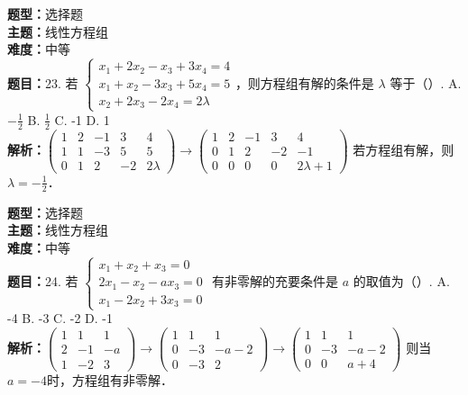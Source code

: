 \documentclass{ctexart}
\newenvironment{question}[5]{%
	\noindent\textbf{题型：}#1\\
	\textbf{主题：}#2\\
	\textbf{难度：}#3\\
	\textbf{题目：}#4\\
	\textbf{解析：}#5\\
	\vspace{1em}
}{}
\begin{document}
	\begin{question}
		{选择题}
		{线性方程组}
		{中等}
		{23. 若 \(\left\{\begin{array}{l}x_1+2 x_2-x_3+3 x_4=4 \\ x_1+x_2-3 x_3+5 x_4=5 \\ x_2+2 x_3-2 x_4=2 \lambda\end{array}\right.\)，则方程组有解的条件是 \(\lambda\) 等于（）.
			A. \(-\frac{1}{2}\)
			B. \(\frac{1}{2}\)
			C. -1
			D. 1}
		{\(\left(\begin{array}{cccc|c}1 & 2 & -1 & 3 & 4 \\ 1 & 1 & -3 & 5 & 5 \\ 0 & 1 & 2 & -2 & 2 \lambda\end{array}\right) \rightarrow\left(\begin{array}{cccc|c}1 & 2 & -1 & 3 & 4 \\ 0 & 1 & 2 & -2 & -1 \\ 0 & 0 & 0 & 0 & 2 \lambda+1\end{array}\right)\) 若方程组有解，则 \(\lambda=-\frac{1}{2}\)．}
	\end{question}
	
	\begin{question}
		{选择题}
		{线性方程组}
		{中等}
		{24. 若 \(\left\{\begin{array}{l}x_1+x_2+x_3=0 \\ 2 x_1-x_2-a x_3=0 \\ x_1-2 x_2+3 x_3=0\end{array}\right.\) 有非零解的充要条件是 \(a\) 的取值为（）.
			A. -4
			B. -3
			C. -2
			D. -1}
		{\(\left(\begin{array}{ccc}1 & 1 & 1 \\ 2 & -1 & -a \\ 1 & -2 & 3\end{array}\right) \rightarrow\left(\begin{array}{ccc}1 & 1 & 1 \\ 0 & -3 & -a-2 \\ 0 & -3 & 2\end{array}\right) \rightarrow\left(\begin{array}{ccc}1 & 1 & 1 \\ 0 & -3 & -a-2 \\ 0 & 0 & a+4\end{array}\right)\) 则当 \(a=-4\)时，方程组有非零解．}
	\end{question}
	
\end{document}
